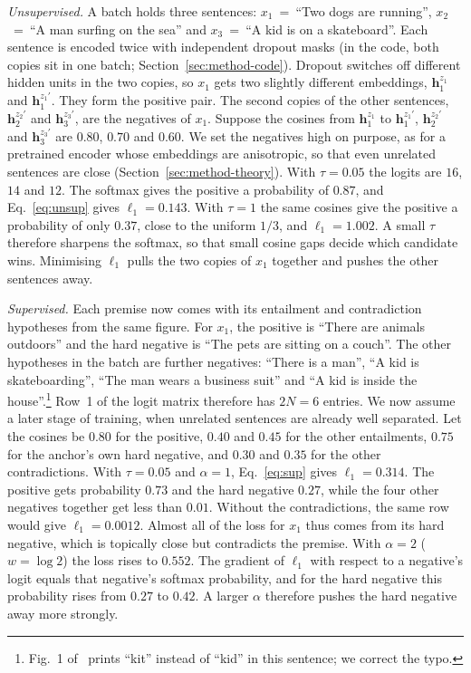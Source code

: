 \emph{Unsupervised.} A batch holds three sentences: $x_1$~=~``Two dogs are
running'', $x_2$~=~``A man surfing on the sea'' and $x_3$~=~``A kid is on a
skateboard''. Each sentence is encoded twice with independent dropout masks
(in the code, both copies sit in one batch; Section~\ref{sec:method-code}).
Dropout switches off different hidden units in the two copies, so $x_1$ gets
two slightly different embeddings, $\mathbf{h}_1^{z_1}$ and
$\mathbf{h}_1^{z_1'}$. They form the positive pair. The second copies of the
other sentences, $\mathbf{h}_2^{z_2'}$ and $\mathbf{h}_3^{z_3'}$, are the
negatives of $x_1$. Suppose the cosines from $\mathbf{h}_1^{z_1}$ to
$\mathbf{h}_1^{z_1'}$, $\mathbf{h}_2^{z_2'}$ and $\mathbf{h}_3^{z_3'}$ are
$0.80$, $0.70$ and $0.60$. We set the negatives high on purpose, as for a
pretrained encoder whose embeddings are anisotropic, so that even unrelated
sentences are close (Section~\ref{sec:method-theory}). With $\tau=0.05$ the
logits are $16$, $14$ and $12$. The softmax gives the positive a probability
of $0.87$, and Eq.~\eqref{eq:unsup} gives $\ell_1=0.143$. With $\tau=1$ the
same cosines give the positive a probability of only $0.37$, close to the
uniform $1/3$, and $\ell_1=1.002$. A small $\tau$ therefore sharpens the
softmax, so that small cosine gaps decide which candidate wins. Minimising
$\ell_1$ pulls the two copies of $x_1$ together and pushes the other sentences
away.

\emph{Supervised.} Each premise now comes with its entailment and
contradiction hypotheses from the same figure. For $x_1$, the positive is
``There are animals outdoors'' and the hard negative is ``The pets are sitting
on a couch''. The other hypotheses in the batch are further negatives: ``There
is a man'', ``A kid is skateboarding'', ``The man wears a business suit'' and
``A kid is inside the house''.\footnote{Fig.~1 of~\cite{gao-etal-2021-simcse}
prints ``kit'' instead of ``kid'' in this sentence; we correct the typo.}
Row~1 of the logit matrix therefore has $2N=6$ entries. We now assume a later
stage of training, when unrelated sentences are already well separated. Let
the cosines be $0.80$ for the positive, $0.40$ and $0.45$ for the other
entailments, $0.75$ for the anchor's own hard negative, and $0.30$ and $0.35$
for the other contradictions. With $\tau=0.05$ and $\alpha=1$,
Eq.~\eqref{eq:sup} gives $\ell_1=0.314$. The positive gets probability $0.73$
and the hard negative $0.27$, while the four other negatives together get less
than $0.01$. Without the contradictions, the same row would give
$\ell_1=0.0012$. Almost all of the loss for $x_1$ thus comes from its hard
negative, which is topically close but contradicts the premise. With $\alpha=2$
($w=\log 2$) the loss rises to $0.552$. The gradient of $\ell_1$ with respect
to a negative's logit equals that negative's softmax probability, and for the
hard negative this probability rises from $0.27$ to $0.42$. A larger $\alpha$
therefore pushes the hard negative away more strongly.

